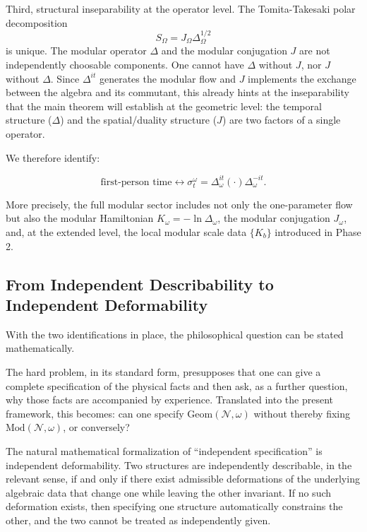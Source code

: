 \documentclass[12pt]{article}
\theoremstyle{definition}
\theoremstyle{remark}
\begin{document}
Third, structural inseparability at the operator level. The
Tomita-Takesaki polar decomposition \[
S_\Omega = J_\Omega \Delta_\Omega^{1/2}
\] is unique. The modular operator \(\Delta\) and the modular
conjugation \(J\) are not independently choosable components. One cannot
have \(\Delta\) without \(J\), nor \(J\) without \(\Delta\). Since
\(\Delta^{it}\) generates the modular flow and \(J\) implements the
exchange between the algebra and its commutant, this already hints at
the inseparability that the main theorem will establish at the geometric
level: the temporal structure (\(\Delta\)) and the spatial/duality
structure (\(J\)) are two factors of a single operator.

We therefore identify:

\[
\text{first-person time} \longleftrightarrow \sigma_t^\omega = \Delta_\omega^{it}(\cdot)\Delta_\omega^{-it}.
\]

More precisely, the full modular sector includes not only the
one-parameter flow but also the modular Hamiltonian
\(K_\omega = -\ln\Delta_\omega\), the modular conjugation \(J_\omega\),
and, at the extended level, the local modular scale data \(\{K_b\}\)
introduced in Phase 2.

\subsection{From Independent Describability to Independent
Deformability}\label{from-independent-describability-to-independent-deformability}

With the two identifications in place, the philosophical question can be
stated mathematically.

The hard problem, in its standard form, presupposes that one can give a
complete specification of the physical facts and then ask, as a further
question, why those facts are accompanied by experience. Translated into
the present framework, this becomes: can one specify
\(\mathrm{Geom}(\mathcal{N},\omega)\) without thereby fixing
\(\mathrm{Mod}(\mathcal{N},\omega)\), or conversely?

The natural mathematical formalization of ``independent specification''
is independent deformability. Two structures are independently
describable, in the relevant sense, if and only if there exist
admissible deformations of the underlying algebraic data that change one
while leaving the other invariant. If no such deformation exists, then
specifying one structure automatically constrains the other, and the two
cannot be treated as independently given.
\end{document}
